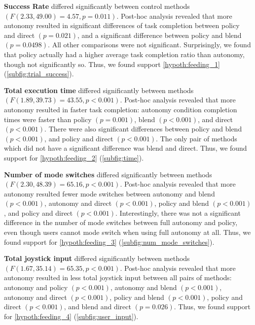 \sloppy
\textbf{Success Rate} differed significantly between control methods $(F(2.33, 49.00)= 4.57, p = 0.011)$. Post-hoc analysis revealed that more autonomy resulted in significant differences of task completion between policy and direct $(p = 0.021)$, and a significant difference between policy and blend $(p=0.0498)$. All other comparisons were not significant. Surprisingly, we found that policy actually had a higher average task completion ratio than autonomy, though not significantly so. Thus, we found support \cref{hypoth:feeding_1} (\cref{subfig:trial_success}).

\textbf{Total execution time} differed significantly between methods $(F(1.89, 39.73) = 43.55, p < 0.001)$. Post-hoc analysis revealed that more autonomy resulted in faster task completion: autonomy condition completion times were faster than policy $(p=0.001)$, blend $(p < 0.001)$, and direct $(p < 0.001)$. There were also significant differences between policy and blend $(p < 0.001)$, and policy and direct $(p < 0.001)$. The only pair of methods which did not have a significant difference was blend and direct. Thus, we found support for \cref{hypoth:feeding_2} (\cref{subfig:time}).

\textbf{Number of mode switches} differed significantly between methods $(F(2.30, 48.39) = 65.16, p < 0.001)$. Post-hoc analysis revealed that more autonomy resulted fewer mode switches between autonomy and blend $(p < 0.001)$, autonomy and direct $(p < 0.001)$, policy and blend $(p < 0.001)$, and policy and direct $(p < 0.001)$. Interestingly, there was not a significant difference in the number of mode switches between full autonomy and policy, even though users cannot mode switch when using full autonomy at all. Thus, we found support for \cref{hypoth:feeding_3} (\cref{subfig:num_mode_switches}).

\textbf{Total joystick input} differed significantly between methods $(F(1.67, 35.14) = 65.35, p < 0.001)$. Post-hoc analysis revealed that more autonomy resulted in less total joystick input between all pairs of methods: autonomy and policy $(p < 0.001)$, autonomy and blend $(p < 0.001)$, autonomy and direct $(p < 0.001)$, policy and blend $(p < 0.001)$, policy and direct $(p < 0.001)$, and blend and direct $(p = 0.026)$. Thus, we found support for \cref{hypoth:feeding_4} (\cref{subfig:user_input}).

